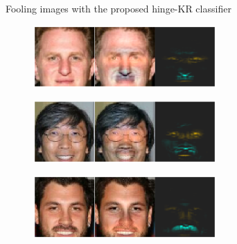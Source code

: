 \documentclass{article}
\begin{document}
\begin{figure}
\begin{subfigure}{1.\textwidth}
\begin{subfigure}{.245\textwidth}
      \label{fig:AddingMoustache_4_OK}
    \end{subfigure}
    \caption{Fooling images with the proposed hinge-KR classifier}
\end{subfigure}  
\begin{subfigure}{1.\textwidth}
    \begin{subfigure}{.245\textwidth}
      \centering
      \includegraphics[width=1\linewidth]{img/adding_mustache_52_k2.png}
      \label{fig:AddingMoustache_grad_1_OK}
    \end{subfigure}%
    \begin{subfigure}{.245\textwidth}
      \centering
      \includegraphics[width=1\linewidth]{img/adding_mustache_54_k4.png}
      \label{fig:AddingMoustache_grad_5_OK}
    \end{subfigure}
    \begin{subfigure}{.245\textwidth}
      \centering
      \includegraphics[width=1\linewidth]{img/remove_mustache_1489_k10.png}
      \label{fig:AddingMoustache_grad_3_OK}
    \end{subfigure}%
    \begin{subfigure}{.245\textwidth}

\end{subfigure}
\end{subfigure}
\end{figure}
\end{document}
